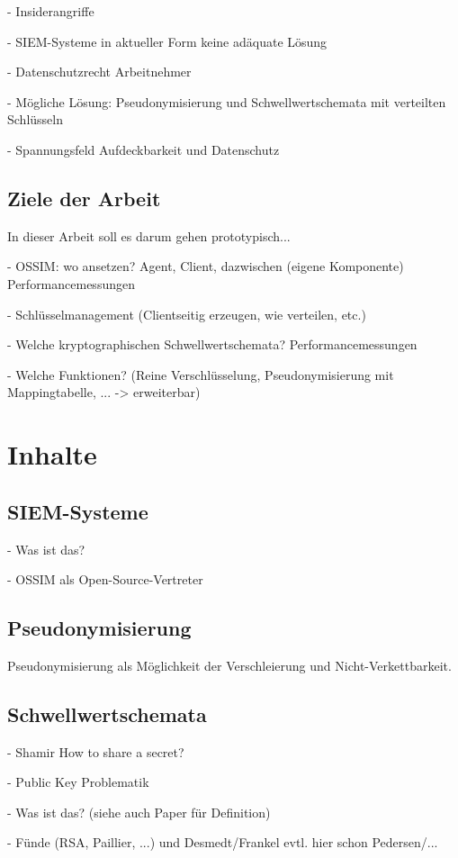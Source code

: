 \documentclass[
    fontsize=12pt,
    headings=small,
    parskip=half,           %
    bibliography=totoc,
    numbers=noenddot,       %
    open=any,               %
    ]{scrreprt}
\begin{document}
- Insiderangriffe 

- SIEM-Systeme in aktueller Form keine adäquate Lösung

- Datenschutzrecht Arbeitnehmer

- Mögliche Lösung: Pseudonymisierung und Schwellwertschemata mit verteilten Schlüsseln

- Spannungsfeld Aufdeckbarkeit und Datenschutz

\section{Ziele der Arbeit}

In dieser Arbeit soll es darum gehen prototypisch...

- OSSIM: wo ansetzen? Agent, Client, dazwischen (eigene Komponente) Performancemessungen

- Schlüsselmanagement (Clientseitig erzeugen, wie verteilen, etc.)

- Welche kryptographischen Schwellwertschemata? Performancemessungen

- Welche Funktionen? (Reine Verschlüsselung, Pseudonymisierung mit Mappingtabelle, ... -> erweiterbar)



\chapter{Inhalte}

\section{SIEM-Systeme}

- Was ist das?

- OSSIM als Open-Source-Vertreter

\section{Pseudonymisierung}

Pseudonymisierung als Möglichkeit der Verschleierung und Nicht-Verkettbarkeit.

\section{Schwellwertschemata}

- Shamir How to share a secret?

- Public Key Problematik

- Was ist das? (siehe auch Paper für Definition)

- Fünde (RSA, Paillier, ...) und Desmedt/Frankel evtl. hier schon Pedersen/...


\begin{raggedright}         %
  \printbibliography        %
  \label{sec:literaturverzeichnis}
\end{raggedright}
\end{document}
